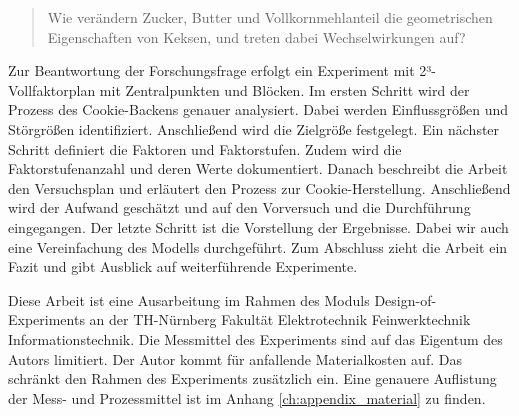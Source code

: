 \begin{quote}
    Wie verändern Zucker, Butter und Vollkornmehlanteil die geometrischen Eigenschaften von Keksen, und treten dabei Wechselwirkungen auf?
\end{quote}

Zur Beantwortung der Forschungsfrage erfolgt ein Experiment mit 2³-Vollfaktorplan mit Zentralpunkten und Blöcken.
Im ersten Schritt wird der Prozess des Cookie-Backens genauer analysiert.
Dabei werden Einflussgrößen und Störgrößen identifiziert.
Anschließend wird die Zielgröße festgelegt.
Ein nächster Schritt definiert die Faktoren und Faktorstufen.
Zudem wird die Faktorstufenanzahl und deren Werte dokumentiert.
Danach beschreibt die Arbeit den Versuchsplan und erläutert den Prozess zur Cookie-Herstellung.
Anschließend wird der Aufwand geschätzt und auf den Vorversuch und die Durchführung eingegangen.
Der letzte Schritt ist die Vorstellung der Ergebnisse.
Dabei wir auch eine Vereinfachung des Modells durchgeführt.
Zum Abschluss zieht die Arbeit ein Fazit und gibt Ausblick auf weiterführende Experimente.

Diese Arbeit ist eine Ausarbeitung im Rahmen des Moduls Design-of-Experiments an der TH-Nürnberg Fakultät Elektrotechnik Feinwerktechnik Informationstechnik.
Die Messmittel des Experiments sind auf das Eigentum des Autors limitiert.
Der Autor kommt für anfallende Materialkosten auf.
Das schränkt den Rahmen des Experiments zusätzlich ein.
Eine genauere Auflistung der Mess- und Prozessmittel ist im Anhang \ref{ch:appendix_material} zu finden.